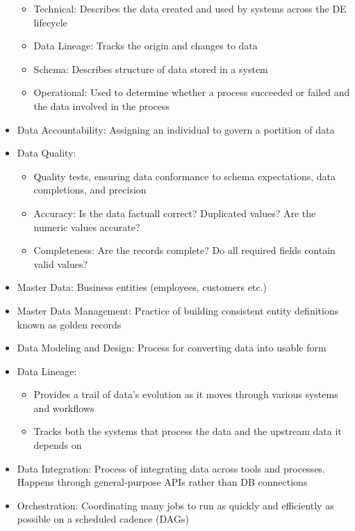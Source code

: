 \documentclass[11pt]{scrartcl}
\begin{document}
\begin{itemize}
\begin{itemize}
		\item Technical: Describes the data created and used by systems across the DE lifecycle
		\item Data Lineage: Tracks the origin and changes to data
		\item Schema: Describes structure of data stored in a system
		\item Operational: Used to determine whether a process succeeded or failed and the data involved in the process
	\end{itemize}
	\item Data Accountability: Assigning an individual to govern a portition of data
	\item Data Quality: 
	\begin{itemize}
		\item Quality tests, ensuring data conformance to schema expectations, data completions, and precision
		\item Accuracy: Is the data factuall correct? Duplicated values? Are the numeric values accurate?
		\item Completeness: Are the records complete? Do all required fields contain valid values? 
	\end{itemize}
	\item Master Data: Business entities (employees, customers etc.)
	\item Master Data Management: Practice of building consistent entity definitions known as golden records
	\item Data Modeling and Design: Process for converting data into usable form
	\item Data Lineage:
	\begin{itemize}
		\item Provides a trail of data's evolution as it moves through various systems and workflows
		\item Tracks both the systems that process the data and the upstream data it depends on
	\end{itemize}
	\item Data Integration: Process of integrating data across tools and processes. Happens through general-purpose APIs rather than DB connections
	\item Orchestration: Coordinating many jobs to run as quickly and efficiently as possible on a scheduled cadence (DAGs)
\end{itemize}
\end{document}
